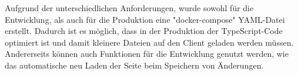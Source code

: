 
Aufgrund der unterschiedlichen Anforderungen, wurde sowohl für die Entwicklung, als auch für die Produktion eine "docker-compose" YAML-Datei erstellt. 
Dadurch ist es möglich, dass in der Produktion der TypeScript-Code optimiert ist und damit kleinere Dateien auf den Client geladen werden müssen. 
Andererseits können auch Funktionen für die Entwicklung genutzt werden, wie das automatische neu Laden der Seite beim Speichern von Änderungen.


